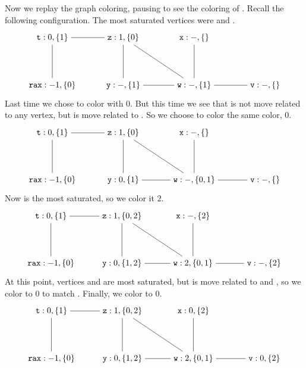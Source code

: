\documentclass[11pt]{book}
\begin{document}
Now we replay the graph coloring, pausing to see the coloring of
. Recall the following configuration. The most saturated vertices
were  and .
\[
\begin{tikzpicture}[baseline=(current  bounding  box.center)]
\node (rax) at (0,0) {$\ttm{rax}:-1,\{0\}$};
\node (t1) at (0,2) {$\ttm{t}:0,\{1\}$};
\node (z) at (3,2)  {$\ttm{z}:1,\{0\}$};
\node (x) at (6,2)  {$\ttm{x}:-,\{\}$};
\node (y) at (3,0)  {$\ttm{y}:-,\{1\}$};
\node (w) at (6,0)  {$\ttm{w}:-,\{1\}$};
\node (v) at (9,0)  {$\ttm{v}:-,\{\}$};

\draw (t1) to (rax);
\draw (t1) to (z);
\draw (z) to (y);
\draw (z) to (w);
\draw (x) to (w);
\draw (y) to (w);
\draw (v) to (w);
\end{tikzpicture}
\]
%
Last time we chose to color  with $0$. But this time we see
that  is not move related to any vertex, but  is move
related to .  So we choose to color  the same color,
$0$.
\[
\begin{tikzpicture}[baseline=(current  bounding  box.center)]
\node (rax) at (0,0) {$\ttm{rax}:-1,\{0\}$};
\node (t1) at (0,2) {$\ttm{t}:0,\{1\}$};
\node (z) at (3,2)  {$\ttm{z}:1,\{0\}$};
\node (x) at (6,2)  {$\ttm{x}:-,\{\}$};
\node (y) at (3,0)  {$\ttm{y}:0,\{1\}$};
\node (w) at (6,0)  {$\ttm{w}:-,\{0,1\}$};
\node (v) at (9,0)  {$\ttm{v}:-,\{\}$};

\draw (t1) to (rax);
\draw (t1) to (z);
\draw (z) to (y);
\draw (z) to (w);
\draw (x) to (w);
\draw (y) to (w);
\draw (v) to (w);
\end{tikzpicture}
\]
Now  is the most saturated, so we color it $2$.
\[
\begin{tikzpicture}[baseline=(current  bounding  box.center)]
\node (rax) at (0,0) {$\ttm{rax}:-1,\{0\}$};
\node (t1) at (0,2) {$\ttm{t}:0,\{1\}$};
\node (z) at (3,2)  {$\ttm{z}:1,\{0,2\}$};
\node (x) at (6,2)  {$\ttm{x}:-,\{2\}$};
\node (y) at (3,0)  {$\ttm{y}:0,\{1,2\}$};
\node (w) at (6,0)  {$\ttm{w}:2,\{0,1\}$};
\node (v) at (9,0)  {$\ttm{v}:-,\{2\}$};

\draw (t1) to (rax);
\draw (t1) to (z);
\draw (z) to (y);
\draw (z) to (w);
\draw (x) to (w);
\draw (y) to (w);
\draw (v) to (w);
\end{tikzpicture}
\]
At this point, vertices  and  are most saturated, but
 is move related to  and , so we color
 to $0$ to match . Finally, we color  to $0$.
\[
\begin{tikzpicture}[baseline=(current  bounding  box.center)]
\node (rax) at (0,0) {$\ttm{rax}:-1,\{0\}$};
\node (t) at (0,2) {$\ttm{t}:0,\{1\}$};
\node (z) at (3,2)  {$\ttm{z}:1,\{0,2\}$};
\node (x) at (6,2)  {$\ttm{x}:0,\{2\}$};
\node (y) at (3,0)  {$\ttm{y}:0,\{1,2\}$};
\node (w) at (6,0)  {$\ttm{w}:2,\{0,1\}$};
\node (v) at (9,0)  {$\ttm{v}:0,\{2\}$};

\draw (t1) to (rax);
\draw (t) to (z);
\draw (z) to (y);
\draw (z) to (w);
\draw (x) to (w);
\draw (y) to (w);
\draw (v) to (w);
\end{tikzpicture}
\]
\end{document}
